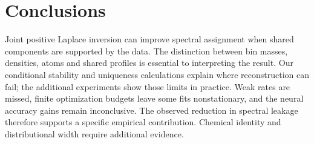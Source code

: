 \section{Conclusions}
Joint positive Laplace inversion can improve spectral assignment when shared
components are supported by the data. The distinction between bin masses,
densities, atoms and shared profiles is essential to interpreting the result.
Our conditional stability and uniqueness calculations explain where reconstruction
can fail; the additional experiments show those limits in practice. Weak rates
are missed, finite optimization budgets leave some fits nonstationary, and the
neural accuracy gains remain inconclusive. The observed reduction in spectral
leakage therefore supports a specific empirical contribution. Chemical identity
and distributional width require additional evidence.